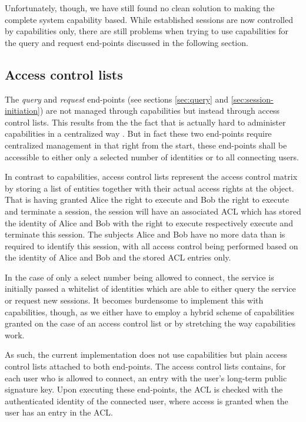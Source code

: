 Unfortunately, though, we have still found no clean solution to making the complete system capability based.
While established sessions are now controlled by capabilities only, there are still problems when trying to use capabilities for the query and request end-points discussed in the following section.

\subsection{Access control lists}

The \emph{query} and \emph{request} end-points (see sections \ref{sec:query} and \ref{sec:session-initiation}) are not managed through capabilities but instead through access control lists.
This results from the the fact that is actually hard to administer capabilities in a centralized way \cite{shapiro1999eros}.
But in fact these two end-points require centralized management in that right from the start, these end-points shall be accessible to either only a selected number of identities or to all connecting users.

In contrast to capabilities, access control lists represent the access control matrix by storing a list of entities together with their actual access rights at the object.
That is having granted Alice the right to execute and Bob the right to execute and terminate a session, the session will have an associated ACL which has stored the identity of Alice and Bob with the right to execute respectively execute and terminate this session.
The subjects Alice and Bob have no more data than is required to identify this session, with all access control being performed based on the identity of Alice and Bob and the stored ACL entries only.

In the case of only a select number being allowed to connect, the service is initially passed a whitelist of identities which are able to either query the service or request new sessions.
It becomes burdensome to implement this with capabilities, though, as we either have to employ a hybrid scheme of capabilities granted on the case of an access control list or by stretching the way capabilities work.

As such, the current implementation does not use capabilities but plain access control lists attached to both end-points.
The access control lists contains, for each user who is allowed to connect, an entry with the user's long-term public signature key.
Upon executing these end-points, the ACL is checked with the authenticated identity of the connected user, where access is granted when the user has an entry in the ACL.

